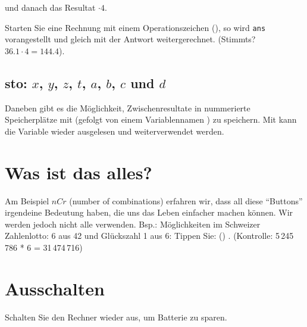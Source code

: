 und danach das Resultat $\cdot4$.


Starten Sie
eine Rechnung mit einem Operationszeichen (\zB {}), so
wird \texttt{ans} vorangestellt und gleich mit der Antwort
weitergerechnet. (Stimmts? $36.1 \cdot{} 4 = 144.4$). 

\subsection{sto: $x$, $y$, $z$, $t$, $a$, $b$, $c$ und $d$}
Daneben gibt es die Möglichkeit, Zwischenresultate in nummerierte
Speicherplätze mit  (gefolgt von einem
Variablennamen ) zu
speichern. Mit   kann die Variable wieder
ausgelesen und weiterverwendet werden.


\section{Was ist das alles?}
Am Beispiel $nCr$ (number of combinations) erfahren wir, dass all
diese ``Buttons'' irgendeine Bedeutung haben, die uns das Leben
einfacher machen können. Wir werden jedoch nicht alle verwenden.
Bsp.: Möglichkeiten im Schweizer Zahlenlotto: 6
aus 42 und Glückszahl 1 aus 6:
Tippen Sie: ()   
  
. (Kontrolle: 5\,245\,786 * 6 = 31\,474\,716)

\section{Ausschalten}
Schalten Sie den Rechner wieder aus, um Batterie zu sparen.



